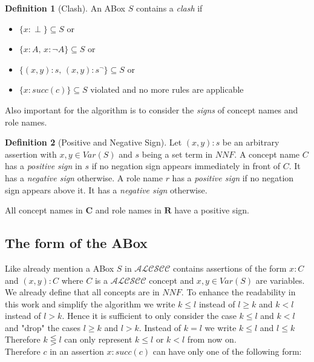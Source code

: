 \documentclass[a4paper,11pt]{scrartcl}
\theoremstyle{break}
\theoremstyle{definition}
\newtheorem{mydef}{Definition}
\begin{document}
\begin{mydef}[Clash]
An ABox $S$ contains a \textit{clash} if
\begin{itemize}
\item $\{x:\perp\}\subseteq S$ or
\item $\{x:A,\,x:\neg A\}\subseteq S$ or
\item $\{(x,y):s,\,(x,y):s^\neg\}\subseteq S$ or
\item $\{x:succ(c)\}\subseteq S$ violated and no more rules are applicable
\end{itemize}
\end{mydef}
Also important for the algorithm is to consider the \textit{signs} of concept names and role names.
\begin{mydef}[Positive and Negative Sign]
Let $(x,y):s$ be an arbitrary assertion with $x,y\in Var(S)$ and $s$ being a set term in $NNF$. A concept name $C$ has a \textit{positive sign} in $s$ if no negation sign appears immediately in front of $C$. It has a \textit{negative sign} otherwise. A role name $r$ has a \textit{positive sign} if no negation sign appears above it. It has a \textit{negative sign} otherwise.
\end{mydef}
All concept names in $\mathbf{C}$ and role names in $\mathbf{R}$ have a positive sign.
\subsection{The form of the ABox}
Like already mention a ABox $S$ in $\mathcal{ALCSCC}$ contains assertions of the form $x:C$ and $(x,y):C$ where $C$ is a $\mathcal{ALCSCC}$ concept and $x,y\in Var(S)$ are variables. We already define that all concepts are in $NNF$. To enhance the readability in this work and simplify the algorithm we write $k\leq l$ instead of $l\geq k$ and $k<l$ instead of $l>k$. Hence it is sufficient to only consider the case $k\leq l$ and $k<l$ and "drop" the cases $l\geq k$ and $l>k$. Instead of $k=l$ we write $k\leq l$ and $l\leq k$ Therefore $k\lesseqgtr l$ can only represent $k\leq l$ or $k<l$ from now on. \\
Therefore $c$ in an assertion $x:succ(c)$ can have only one of the following form:
\end{document}
